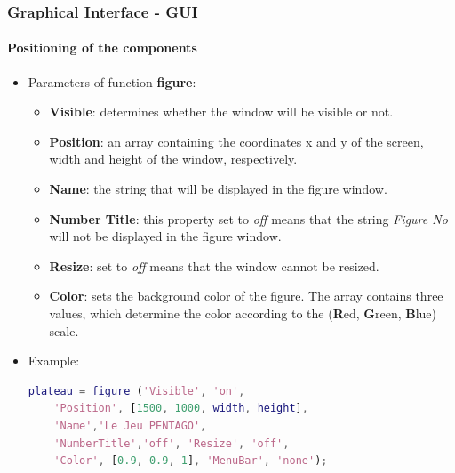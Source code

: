 \documentclass[10pt]{beamer}
\begin{document}
\begin{frame}[fragile]

\frametitle{Graphical Interface - GUI}
\framesubtitle{Positioning of the components}

\begin{itemize}
  	\item Parameters of function \textbf{figure}:
	
	\begin{itemize}
	  
		\item \textbf{Visible}: determines whether the window will be visible or not.
		\item \textbf{Position}: an array containing the coordinates x and y of
		the screen, width and height of the window, respectively.
		\item \textbf{Name}: the string that will be displayed in the figure window.
		\item \textbf{Number Title}: this property set to \textit{off} means that the string
		\textit{Figure No} will not be displayed in the figure window.
		\item \textbf{Resize}: set to \textit{off} means that the window cannot be
		resized.
		\item \textbf{Color}: sets the background color of the figure. The array
		contains three values, which determine the color according to the
		(\textbf{R}ed, \textbf{G}reen, \textbf{B}lue) scale.

	\end{itemize}
	\item Example:
\begin{lstlisting}[language=Matlab]
plateau = figure ('Visible', 'on', 
	'Position', [1500, 1000, width, height], 
	'Name','Le Jeu PENTAGO',
	'NumberTitle','off', 'Resize', 'off',
	'Color', [0.9, 0.9, 1], 'MenuBar', 'none');
\end{lstlisting}
\end{itemize}

\end{frame}
\end{document}
